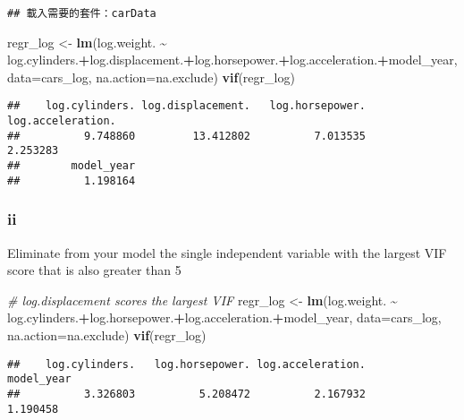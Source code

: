 \documentclass[
]{article}
\newenvironment{Shaded}{\begin{snugshade}}{\end{snugshade}}
\newcommand{\AttributeTok}[1]{\textcolor[rgb]{0.13,0.29,0.53}{#1}}
\newcommand{\CommentTok}[1]{\textcolor[rgb]{0.56,0.35,0.01}{\textit{#1}}}
\newcommand{\FunctionTok}[1]{\textcolor[rgb]{0.13,0.29,0.53}{\textbf{#1}}}
\newcommand{\NormalTok}[1]{#1}
\newcommand{\OtherTok}[1]{\textcolor[rgb]{0.56,0.35,0.01}{#1}}
\newcommand{\SpecialCharTok}[1]{\textcolor[rgb]{0.81,0.36,0.00}{\textbf{#1}}}
\begin{document}
\begin{verbatim}
## 載入需要的套件：carData
\end{verbatim}

\begin{Shaded}
\begin{Highlighting}[]
\NormalTok{regr\_log }\OtherTok{\textless{}{-}} \FunctionTok{lm}\NormalTok{(log.weight. }\SpecialCharTok{\textasciitilde{}}\NormalTok{ log.cylinders.}\SpecialCharTok{+}\NormalTok{log.displacement.}\SpecialCharTok{+}\NormalTok{log.horsepower.}\SpecialCharTok{+}\NormalTok{log.acceleration.}\SpecialCharTok{+}\NormalTok{model\_year,}
                 \AttributeTok{data=}\NormalTok{cars\_log, }\AttributeTok{na.action=}\NormalTok{na.exclude)}
\FunctionTok{vif}\NormalTok{(regr\_log)}
\end{Highlighting}
\end{Shaded}

\begin{verbatim}
##    log.cylinders. log.displacement.   log.horsepower. log.acceleration. 
##          9.748860         13.412802          7.013535          2.253283 
##        model_year 
##          1.198164
\end{verbatim}

\hypertarget{ii-2}{%
\subsubsection{ii}\label{ii-2}}

Eliminate from your model the single independent variable with the
largest VIF score that is also greater than 5

\begin{Shaded}
\begin{Highlighting}[]
\CommentTok{\# log.displacement scores the largest VIF}
\NormalTok{regr\_log }\OtherTok{\textless{}{-}} \FunctionTok{lm}\NormalTok{(log.weight. }\SpecialCharTok{\textasciitilde{}}\NormalTok{ log.cylinders.}\SpecialCharTok{+}\NormalTok{log.horsepower.}\SpecialCharTok{+}\NormalTok{log.acceleration.}\SpecialCharTok{+}\NormalTok{model\_year,}
                 \AttributeTok{data=}\NormalTok{cars\_log, }\AttributeTok{na.action=}\NormalTok{na.exclude)}
\FunctionTok{vif}\NormalTok{(regr\_log)}
\end{Highlighting}
\end{Shaded}

\begin{verbatim}
##    log.cylinders.   log.horsepower. log.acceleration.        model_year 
##          3.326803          5.208472          2.167932          1.190458
\end{verbatim}
\end{document}
